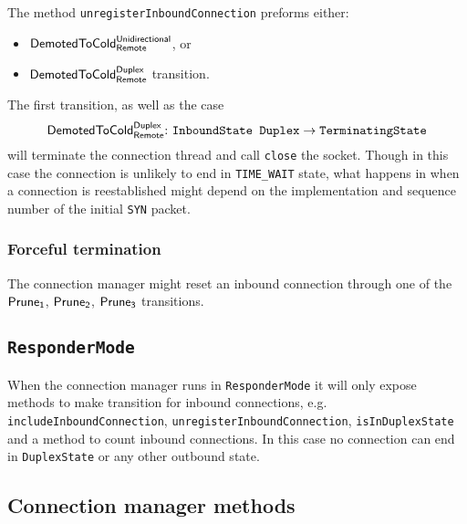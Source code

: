 \documentclass{article}
\def\DuplexState{\texttt{DuplexState}}
\def\InboundStateDup{\texttt{InboundState Duplex}}
\def\TerminatingState{\texttt{TerminatingState}}
\def\DemotedToColdDupRem{$\text{\textsf{DemotedToCold}}^\text{\textsf{Duplex}}_\text{\textsf{Remote}}$}
\def\DemotedToColdUniRem{$\text{\textsf{DemotedToCold}}^\text{\textsf{Unidirectional}}_\text{\textsf{Remote}}$}
\def\PruneA{$\text{\textsf{Prune}}_\text{\textsf{1}}$}
\def\PruneB{$\text{\textsf{Prune}}_\text{\textsf{2}}$}
\def\PruneC{$\text{\textsf{Prune}}_\text{\textsf{3}}$}
\begin{document}
The method \texttt{unregisterInboundConnection} preforms either:
\begin{itemize}
  \item \DemotedToColdUniRem{}, or
  \item \DemotedToColdDupRem{} transition.
\end{itemize}
The first transition, as well as the case
\[
  \text{\DemotedToColdDupRem:\ \InboundStateDup{}}\rightarrow\text{\TerminatingState{}}
\]
will terminate the connection thread and call \texttt{close} the socket.
Though in this case the connection is unlikely to end in \texttt{TIME\_WAIT}
state, what happens in when a connection is reestablished might depend on the
implementation and sequence number of the initial \texttt{SYN}
packet\cite[Chapter 2, \texttt{TIME\_WAIT} section]{stevens2003unix}.

\subsubsection{Forceful termination}
The connection manager might reset an inbound connection through one of the
\PruneA{}, \PruneB{}, \PruneC{} transitions.

\subsection{\texttt{ResponderMode}}
When the connection manager runs in \texttt{ResponderMode} it will only expose
methods to make transition for inbound connections, e.g.
\texttt{includeInboundConnection}, \texttt{unregisterInboundConnection},
\texttt{isInDuplexState} and a method to count inbound connections.  In this
case no connection can end in \DuplexState{} or any other outbound state.

\subsection{Connection manager methods}
\end{document}

